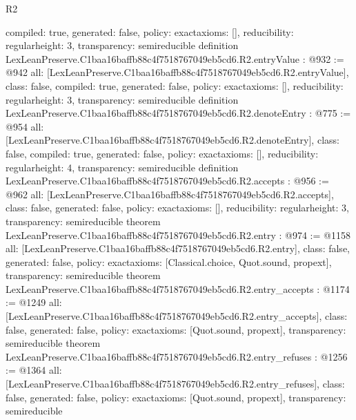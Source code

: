 \begin{lexlean}{R2}
\begin{coremodule}
{  compiled: true,
  generated: false,
  policy: exact{axioms: []},
  reducibility: regular{height: 3},
  transparency: semireducible
}
definition LexLeanPreserve.C1baa16baffb88c4f7518767049eb5cd6.R2.entryValue : @932 := @942 {
  all: [LexLeanPreserve.C1baa16baffb88c4f7518767049eb5cd6.R2.entryValue],
  class: false,
  compiled: true,
  generated: false,
  policy: exact{axioms: []},
  reducibility: regular{height: 3},
  transparency: semireducible
}
definition LexLeanPreserve.C1baa16baffb88c4f7518767049eb5cd6.R2.denoteEntry : @775 := @954 {
  all: [LexLeanPreserve.C1baa16baffb88c4f7518767049eb5cd6.R2.denoteEntry],
  class: false,
  compiled: true,
  generated: false,
  policy: exact{axioms: []},
  reducibility: regular{height: 4},
  transparency: semireducible
}
definition LexLeanPreserve.C1baa16baffb88c4f7518767049eb5cd6.R2.accepts : @956 := @962 {
  all: [LexLeanPreserve.C1baa16baffb88c4f7518767049eb5cd6.R2.accepts],
  class: false,
  generated: false,
  policy: exact{axioms: []},
  reducibility: regular{height: 3},
  transparency: semireducible
}
theorem LexLeanPreserve.C1baa16baffb88c4f7518767049eb5cd6.R2.entry : @974 := @1158 {
  all: [LexLeanPreserve.C1baa16baffb88c4f7518767049eb5cd6.R2.entry],
  class: false,
  generated: false,
  policy: exact{axioms: [Classical.choice, Quot.sound, propext]},
  transparency: semireducible
}
theorem LexLeanPreserve.C1baa16baffb88c4f7518767049eb5cd6.R2.entry_accepts : @1174 := @1249 {
  all: [LexLeanPreserve.C1baa16baffb88c4f7518767049eb5cd6.R2.entry_accepts],
  class: false,
  generated: false,
  policy: exact{axioms: [Quot.sound, propext]},
  transparency: semireducible
}
theorem LexLeanPreserve.C1baa16baffb88c4f7518767049eb5cd6.R2.entry_refuses : @1256 := @1364 {
  all: [LexLeanPreserve.C1baa16baffb88c4f7518767049eb5cd6.R2.entry_refuses],
  class: false,
  generated: false,
  policy: exact{axioms: [Quot.sound, propext]},
  transparency: semireducible
}


\end{coremodule}
\end{lexlean}
